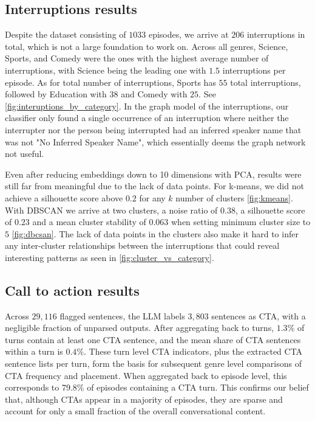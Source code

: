 \documentclass{article}
\begin{document}
\subsection{Interruptions results}
Despite the dataset consisting of $1033$ episodes, we arrive at $206$ interruptions in total, which is not a large foundation to work on. Across all genres, Science, Sports, and Comedy were the ones with the highest average number of interruptions, with Science being the leading one with $1.5$ interruptions per episode. As for total number of interruptions, Sports has $55$ total interruptions, followed by Education with $38$ and Comedy with $25$. See \ref{fig:interuptions_by_category}. In the graph model of the interruptions, our classifier only found a single occurrence of an interruption where neither the interrupter nor the person being interrupted had an inferred speaker name that was not "No Inferred Speaker Name", which essentially deems the graph network not useful.

Even after reducing embeddings down to 10 dimensions with PCA, results were still far from meaningful due to the lack of data points. For k-means, we did not achieve a silhouette score above $0.2$ for any $k$ number of clusters \ref{fig:kmeans}. With DBSCAN we arrive at two clusters, a noise ratio of $0.38$, a silhouette score of $0.23$ and a mean cluster stability of $0.063$ when setting minimum cluster size to $5$ \ref{fig:dbcsan}. The lack of data points in the clusters also make it hard to infer any inter-cluster relationships between the interruptions that could reveal interesting patterns as seen in \ref{fig:cluster_vs_category}.

\subsection{Call to action results}

Across $29{,}116$ flagged sentences, the LLM labels $3{,}803$ sentences as CTA, with a negligible fraction of unparsed outputs. After aggregating back to turns, $1.3\%$ of turns contain at least one CTA sentence, and the mean share of CTA sentences within a turn is $0.4\%$. These turn level CTA indicators, plus the extracted CTA sentence lists per turn, form the basis for subsequent genre level comparisons of CTA frequency and placement. When aggregated back to episode level, this corresponds to 79.8\% of episodes containing a CTA turn. This confirms our belief that, although CTAs appear in a majority of episodes, they are sparse and account for only a small fraction of the overall conversational content. 
\end{document}
